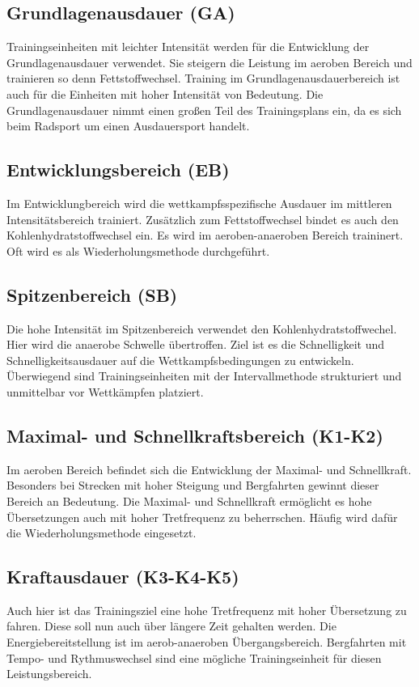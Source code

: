\subsection{Grundlagenausdauer (GA)}
Trainingseinheiten mit leichter Intensität werden für die Entwicklung der Grundlagenausdauer verwendet. Sie steigern die Leistung im aeroben Bereich und trainieren so denn Fettstoffwechsel.  
Training im Grundlagenausdauerbereich ist auch für die Einheiten mit hoher Intensität von Bedeutung. Die Grundlagenausdauer nimmt einen großen Teil des Trainingsplans ein, da es sich beim Radsport um einen Ausdauersport handelt.
\subsection{Entwicklungsbereich (EB)}
Im Entwicklungbereich wird die wettkampfsspezifische Ausdauer im mittleren Intensitätsbereich trainiert. Zusätzlich zum Fettstoffwechsel bindet es auch den Kohlenhydratstoffwechsel ein. Es wird im aeroben-anaeroben Bereich traininert. Oft wird es als Wiederholungsmethode durchgeführt.
\subsection{Spitzenbereich (SB)}
Die hohe Intensität im Spitzenbereich verwendet den Kohlenhydratstoffwechel. Hier wird die anaerobe Schwelle übertroffen. Ziel ist es die Schnelligkeit und Schnelligkeitsausdauer auf die Wettkampfsbedingungen zu entwickeln. Überwiegend sind Trainingseinheiten mit der Intervallmethode strukturiert und unmittelbar vor Wettkämpfen platziert.
\subsection{Maximal- und Schnellkraftsbereich (K1-K2)}
Im aeroben Bereich befindet sich die Entwicklung der Maximal- und Schnellkraft. Besonders bei Strecken mit hoher Steigung und Bergfahrten gewinnt dieser Bereich an Bedeutung. Die Maximal- und Schnellkraft ermöglicht es hohe Übersetzungen auch mit hoher Tretfrequenz zu beherrschen. Häufig wird dafür die Wiederholungsmethode eingesetzt.
\subsection{Kraftausdauer (K3-K4-K5)}
Auch hier ist das Trainingsziel eine hohe Tretfrequenz mit hoher Übersetzung zu fahren. Diese soll nun auch über längere Zeit gehalten werden. Die Energiebereitstellung ist im aerob-anaeroben Übergangsbereich. Bergfahrten mit Tempo- und Rythmuswechsel sind eine mögliche Trainingseinheit für diesen Leistungsbereich. \par

